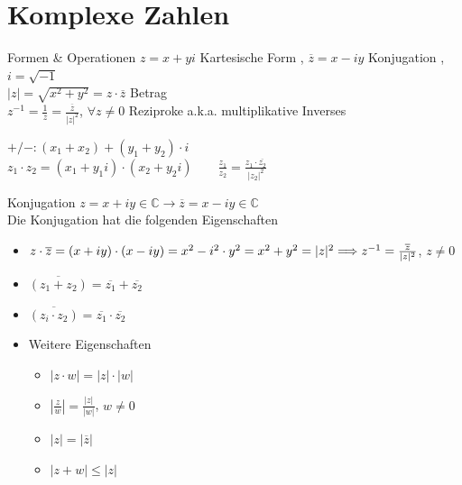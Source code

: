 \section{Komplexe Zahlen}
\begin{mainbox}{Formen \& Operationen}
  $z = x + yi$
    \tiny \color{gray}
      Kartesische Form
    \color{black} \normalsize,
  $\overline{z} = x - iy$
    \tiny \color{gray}
      Konjugation
    \color{black} \normalsize, 
    $i = \sqrt{-1} $ \\
  $|z| = \sqrt{x^2 + y^2} = z \cdot \overline{z}$ 
    \tiny \color{gray}
      Betrag
    \color{black} \normalsize\\
  $z^{-1} = \frac{1}{z} = \frac{\overline{z}}{|z|^2}$, $\forall z \neq 0$
    \tiny \color{gray}
      Reziproke a.k.a. multiplikative Inverses
    \color{black} \normalsize
    
  $+/-: (x_1 + x_2) + (y_1 + y_2) \cdot i$ \\
  $z_1 \cdot z_2 = (x_1 + y_1i) \cdot (x_2 + y_2i) \qquad \frac{z_1}{z_2} = \frac{z_1 \cdot \overline{z_2}}{|z_2|^2}$ \\
\end{mainbox}

\begin{mainbox}{Konjugation}
  $z = x + iy \in \mathbb{C} \longrightarrow \overline{z} = x - iy \in \mathbb{C}$ \\
  Die Konjugation hat die folgenden Eigenschaften
  \begin{itemize}
    \item[i)]  $z \cdot \overline{z} = (x + iy) \cdot (x - iy) = x^2 - i^2 \cdot y^2 \\ = x^2 + y^2 = |z|^2 \Longrightarrow z^{-1} = \frac{\overline{z}}{|z|^2}$, $z \neq 0$
    \item[ii)] $\overline{(z_1 + z_2)} = \overline{z_1} + \overline{z_2}$
    \item[iii)] $\overline{(z_i \cdot z_2)} = \overline{z_1} \cdot \overline{z_2}$
  \end{itemize}
\end{mainbox}

\begin{itemize}[leftmargin=4.5mm, topsep=1pt, itemsep=1pt, parsep=1pt]
    \item Weitere Eigenschaften
    \begin{itemize}[leftmargin=4.5mm, topsep=1pt, itemsep=1pt, parsep=1pt]
      \item[i)] $|z \cdot w| = |z| \cdot |w|$
      \item[ii)] $\left| \frac{z}{w} \right| = \frac{|z|}{|w|}$, $w \neq 0$
      \item[iii)] $|z| = |\overline{z}|$
      \item[iv)] $|z + w| \leqslant |z|$
    \end{itemize} 
  \end{itemize}

